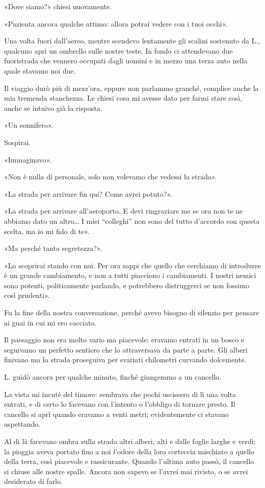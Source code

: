 «Dove siamo?» chiesi nuovamente.

«Pazienta ancora qualche attimo: allora potrai vedere con i tuoi occhi».

Una volta fuori dall'aereo, mentre scendevo lentamente gli scalini sostenuto da L., qualcuno aprì un
ombrello sulle nostre teste. In fondo ci attendevano due fuoristrada che vennero occupati dagli
uomini e in mezzo una terza auto nella quale stavamo noi due.

Il viaggio durò più di mezz'ora, eppure non parlammo granché, complice anche la mia tremenda
stanchezza. Le chiesi cosa mi avesse dato per farmi stare così, anche se intuivo già la risposta.

«Un sonnifero».

Sospirai.

«Immaginavo».

«Non è nulla di personale, solo non volevamo che vedessi la strada».

«La strada per arrivare fin qui? Come avrei potuto?».

«La strada per arrivare all'aeroporto. E devi ringraziare me se ora non te ne abbiamo dato un
altro\dots{} I miei ``colleghi'' non sono del tutto d'accordo con questa scelta, ma io mi fido di
te».

«Ma perché tanta segretezza?».

«Lo scoprirai stando con noi. Per ora sappi che quello che cerchiamo di introdurre è un grande
cambiamento, e non a tutti piacciono i cambiamenti. I nostri nemici sono potenti, politicamente
parlando, e potrebbero distruggerci se non fossimo così prudenti».

Fu la fine della nostra conversazione, perché avevo bisogno di silenzio per pensare ai guai in cui
mi ero cacciato.

Il paesaggio non era molto vario ma piacevole: eravamo entrati in un bosco e seguivamo un perfetto
sentiero che lo attraversava da parte a parte. Gli alberi finivano ma la strada proseguiva per
svariati chilometri curvando dolcemente.

L. guidò ancora per qualche minuto, finché giungemmo a un cancello.

La vista mi incutè del timore: sembrava che pochi uscissero di lì una volta entrati, e di certo lo
facevano con l'intento o l'obbligo di tornare presto. Il cancello si aprì quando eravamo a venti
metri; evidentemente ci stavano aspettando.

Al di là facevano ombra sulla strada altri alberi, alti e dalle foglie larghe e verdi; la pioggia
aveva portato fino a noi l'odore della loro corteccia mischiato a quello della terra, così piacevole
e rassicurante. Quando l'ultima auto passò, il cancello si chiuse alle nostre spalle. Ancora non
sapevo se l'avrei mai rivisto, o se avrei desiderato di farlo.

